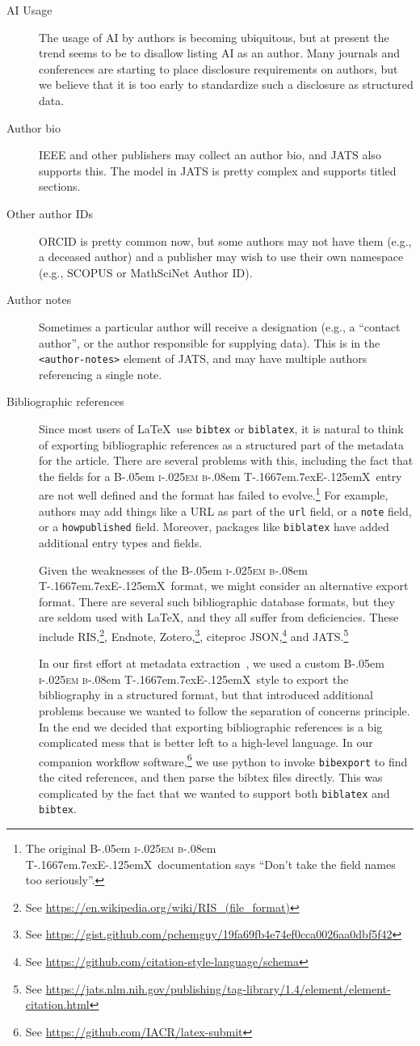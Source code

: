\documentclass{article}
\newcommand{\BibTeX}{{\rmfamily B\kern-.05em%
   \textsc{i\kern-.025em b}\kern-.08em%
   T\kern-.1667em\lower.7ex\hbox{E}\kern-.125emX}}
\newcommand{\pkg}[1]{\texttt{#1}}
\begin{document}
\begin{description}
\item[AI Usage] The usage of AI by authors is becoming ubiquitous, but at present
the trend seems to be to disallow listing AI as an author. Many journals and conferences
are starting to place disclosure requirements on authors, but we believe that it is
too early to standardize such a disclosure as structured data.
\item[Author bio] IEEE and other publishers may collect an author bio, and JATS
also supports this. The model in JATS is pretty complex and supports titled sections.
\item[Other author IDs] ORCID is pretty common now, but some authors may not have them (e.g., a deceased author) and
a publisher may wish to use their own namespace (e.g., SCOPUS or MathSciNet Author ID).
\item[Author notes] Sometimes a particular author will receive a designation (e.g., a ``contact author'',
or the author responsible for supplying data). This is in the \texttt{\textless{author-notes}\textgreater} element of JATS, and
may have multiple authors referencing a single note.
\item[Bibliographic references] Since most users of \LaTeX\ use \texttt{bibtex} or \texttt{biblatex},
it is natural to think of exporting bibliographic references as a
structured part of the metadata for the article. There are several
problems with this, including the fact that the fields for a \BibTeX\
entry are not well defined and the format has failed to evolve.\footnote{The
original \BibTeX\ documentation says ``Don't take the field names too
seriously''.}  For example, authors may add things like a URL as part
of the \texttt{url} field, or a \texttt{note} field, or
a \texttt{howpublished} field.  Moreover, packages
like \texttt{biblatex} have added additional entry types and fields.

Given the weaknesses of the \BibTeX\ format, we might consider an
alternative export format.  There are several such bibliographic
database formats, but they are seldom used with \LaTeX, and they all
suffer from deficiencies.  These include
RIS,\footnote{See \url{https://en.wikipedia.org/wiki/RIS_(file_format)}},
Endnote,
Zotero,\footnote{See \url{https://gist.github.com/pchemguy/19fa69fb4e74ef0cca0026aa0dbf5f42}},
citeproc
JSON,\footnote{See \url{https://github.com/citation-style-language/schema}}
and
JATS.\footnote{See \url{https://jats.nlm.nih.gov/publishing/tag-library/1.4/element/element-citation.html}}

In our first effort at metadata extraction~\cite{tugboat}, we used a
custom \BibTeX\ style to export the bibliography in a structured
format, but that introduced additional problems because we wanted to
follow the separation of concerns principle.  In the end we decided
that exporting bibliographic references is a big complicated mess that
is better left to a high-level language.  In our companion workflow
software,\footnote{See \url{https://github.com/IACR/latex-submit}} we
use python to invoke \pkg{bibexport} to find the cited references, and
then parse the bibtex files directly. This was complicated by the fact
that we wanted to support both
\pkg{biblatex} and \pkg{bibtex}.


\end{description}
\end{document}
